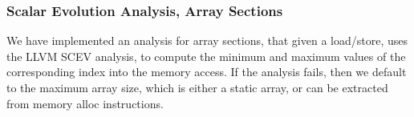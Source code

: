 \subsubsection{Scalar Evolution Analysis, Array Sections}
We have implemented an analysis for array sections, 
that given a load/store, uses the LLVM SCEV analysis, to compute the minimum and maximum values of 
the corresponding index into the memory access. 
If the analysis fails, then we default to the maximum array size, 
which is either a static array, or can be extracted from 
memory alloc instructions.
